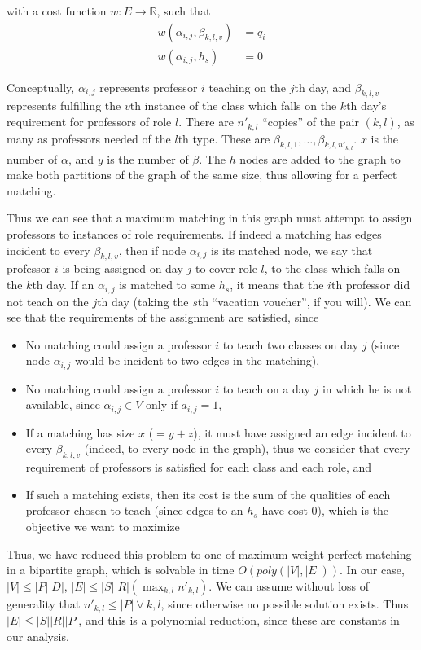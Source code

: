 with a cost function $w: E \to \mathbb{R}$, such that
\begin{align*}
w(\alpha_{i, j}, \beta_{k, l, v}) &= q_i\\
w(\alpha_{i, j}, h_s) &= 0
\end{align*}

Conceptually, $\alpha_{i, j}$ represents professor $i$ teaching on the $j$th day, and $\beta_{k, l, v}$ represents fulfilling the $v$th instance of the class which falls on the $k$th day's requirement for professors of role $l$. There are $n'_{k, l}$ ``copies'' of the pair $(k, l)$, as many as professors needed of the $l$th type. These are $\beta_{k, l, 1}, \dots, \beta_{k, l, n'_{k, l}}$. $x$ is the number of $\alpha$, and $y$ is the number of $\beta$. The $h$ nodes are added to the graph to make both partitions of the graph of the same size, thus allowing for a perfect matching.

Thus we can see that a maximum matching in this graph must attempt to assign professors to instances of role requirements. If indeed a matching has edges incident to every $\beta_{k, l, v}$, then if node $\alpha_{i, j}$ is its matched node, we say that professor $i$ is being assigned on day $j$ to cover role $l$, to the class which falls on the $k$th day. If an $\alpha_{i, j}$ is matched to some $h_s$, it means that the $i$th professor did not teach on the $j$th day (taking the $s$th ``vacation voucher'', if you will). We can see that the requirements of the assignment are satisfied, since

\begin{itemize}
\item No matching could assign a professor $i$ to teach two classes on day $j$ (since node $\alpha_{i, j}$ would be incident to two edges in the matching),
\item No matching could assign a professor $i$ to teach on a day $j$ in which he is not available, since $\alpha_{i, j} \in V$ only if $a_{i, j} = 1$,
\item If a matching has size $x$ ($= y + z$), it must have assigned an edge incident to every $\beta_{k, l, v}$ (indeed, to every node in the graph), thus we consider that every requirement of professors is satisfied for each class and each role, and
\item If such a matching exists, then its cost is the sum of the qualities of each professor chosen to teach (since edges to an $h_s$ have cost 0), which is the objective we want to maximize
\end{itemize}

Thus, we have reduced this problem to one of maximum-weight perfect matching in a bipartite graph, which is solvable in time $O(poly(|V|, |E|))$. In our case, $|V| \le |P||D|$, $|E| \le |S||R|(\max_{k, l} n'_{k, l})$. We can assume without loss of generality that $n'_{k, l} \le |P|\ \forall\ k, l$, since otherwise no possible solution exists. Thus $|E| \le |S||R||P|$, and this is a polynomial reduction, since these are constants in our analysis.

